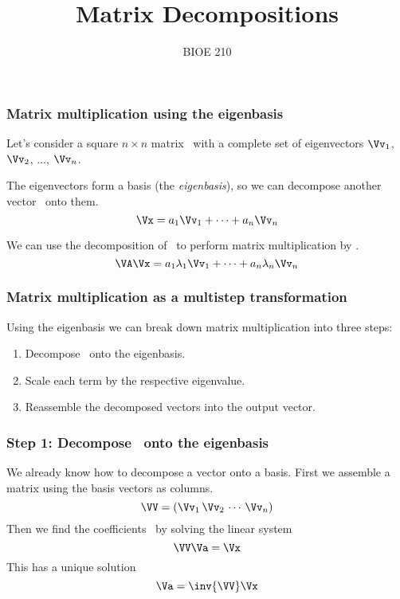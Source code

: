 \documentclass{beamer}
\title{Matrix Decompositions}
\date{}
\author{BIOE 210}
\begin{document}
\maketitle

\begin{frame}
\frametitle{Matrix multiplication using the eigenbasis}

Let's consider a square $n\times n$ matrix \VA\ with a complete set of eigenvectors $\Vv_1$, $\Vv_2$, $\ldots$, $\Vv_n$.

\bigskip
The eigenvectors form a basis (the \emph{eigenbasis}), so we can decompose another vector \Vx\ onto them.
\[ \Vx = a_1\Vv_1 + \cdots + a_n\Vv_n \]

We can use the decomposition of \Vx\ to perform matrix multiplication by \VA.
\[ \VA\Vx = a_1\lambda_1\Vv_1 + \cdots + a_n\lambda_n\Vv_n \]
\end{frame}


\begin{frame}
\frametitle{Matrix multiplication as a multistep transformation}

Using the eigenbasis we can break down matrix multiplication into three steps:
\begin{enumerate}
	\item Decompose \Vx\ onto the eigenbasis.
	\item Scale each term by the respective eigenvalue.
	\item Reassemble the decomposed vectors into the output vector.
\end{enumerate}
\end{frame}

\begin{frame}
\frametitle{Step 1: Decompose \Vx\ onto the eigenbasis}

We already know how to decompose a vector onto a basis. First we assemble a matrix using the basis vectors as columns.
\[ \VV = \left(\Vv_1\, \Vv_2\, \cdots\, \Vv_n\right) \]
Then we find the coefficients \Va\ by solving the linear system
\[ \VV\Va = \Vx \]
This has a unique solution
\[ \Va = \inv{\VV}\Vx \]
\end{frame}
\end{document}
